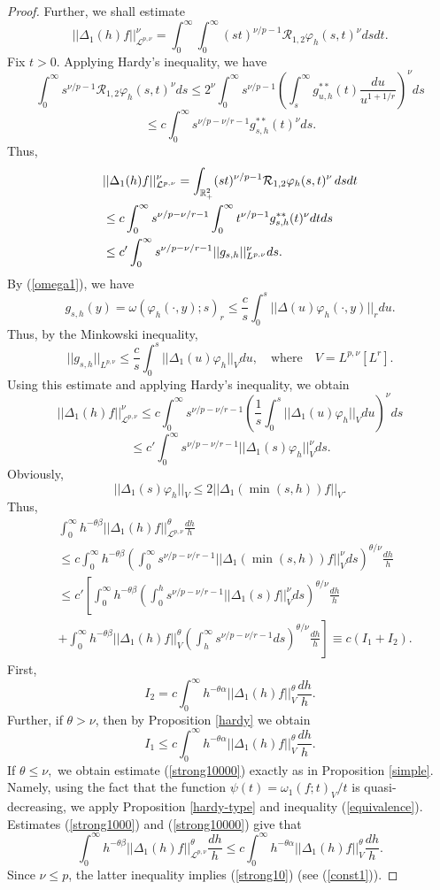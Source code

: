 \documentclass[12pt,twoside,reqno]{amsart}
\numberwithin{equation}{section}
\theoremstyle{definition}
\numberwithin{equation}{section}
\def\a{\alpha}
\def\b{\beta}
\def\o{\omega}
\def\t{\theta}
\def\f{\varphi}
\def\D{\Delta}
\begin{document}
\begin{proof}
Further, we shall estimate
$$
||\Delta_1 (h)f||_{\mathcal L^{p,\nu}}^\nu=\int_0^\infty\int_0^\infty(st)^{\nu/p-1}
\mathcal R_{1,2}\f_h(s,t)^\nu dsdt.
$$
Fix $t>0$. Applying Hardy's inequality, we have
$$
\int_0^\infty s^{\nu/p-1}
\mathcal R_{1,2}\f_h(s,t)^\nu ds\le 2^\nu \int_0^\infty s^{\nu/p-1} \left(\int_s^\infty g_{u,h}^{**}(t)\frac{du}{u^{1+1/r}}\right)^\nu ds
$$
$$
\le c\int_0^\infty s^{\nu/p-\nu/r-1}g_{s,h}^{**}(t)^\nu ds.
$$
Thus,
$$
\begin{aligned}
&||\Delta_1 (h)f||_{\mathcal L^{p,\nu}}^\nu=\int_{\Bbb R _+^2}
(st)^{\nu/p-1}\mathcal R_{1,2}\f_h(s,t)^\nu\,dsdt\\
&\le c\int_0^\infty s^{\nu/p-\nu/r-1}
\int_0^\infty t^{\nu/p-1}g_{s,h}^{**}(t)^\nu dtds\\
&\le  c'\int_0^\infty s^{\nu/p-\nu/r-1}||g_{s,h}||_{L^{p,\nu}}^\nu ds.
\end{aligned}
$$
By (\ref{omega1}), we have
$$
g_{s,h}(y)= \o(\f_h(\cdot,y);s)_r\le \frac{c}{s}\int_0^s ||\D(u)\f_h(\cdot,y)||_rdu.
$$
Thus, by the Minkowski inequality,
$$
||g_{s,h}||_{L^{p,\nu}}\le \frac{c}{s}\int_0^s ||\Delta_1(u)\f_h||_V du, \quad\mbox{where}\quad V=L^{p,\nu}[L^r].
$$
Using this estimate and applying Hardy's inequality, we obtain
$$
||\Delta_1 (h)f||_{\mathcal L^{p,\nu}}^\nu\le c \int_0^\infty s^{\nu/p-\nu/r-1}\left(\frac{1}{s}\int_0^s ||\Delta_1(u)\f_h||_V du\right)^\nu ds
$$
$$
\le c'\int_0^\infty s^{\nu/p-\nu/r-1}||\Delta_1(s)\f_h||_V^\nu ds.
$$
Obviously,
$$
||\D_1(s)\f_h||_V\le 2||\D_1(\min(s,h))f||_V.
$$
Thus,
$$
\begin{aligned}
&\int_0^\infty h^{-\t\b}||\Delta_1 (h)f||_{\mathcal L^{p,\nu}}^\t\frac{dh}{h}\\
&\le c \int_0^\infty h^{-\t\b}\left(\int_0^\infty s^{\nu/p-\nu/r-1}||\D_1(\min(s,h))f||_V^\nu ds\right)^{\t/\nu}\frac{dh}{h}\\
&\le c'\left[ \int_0^\infty h^{-\t\b}\left(\int_0^h s^{\nu/p-\nu/r-1}||\D_1(s)f||_V^\nu ds\right)^{\t/\nu}\frac{dh}{h}\right.\\
&+\left.\int_0^\infty h^{-\t\b}||\D_1(h)f||_V^\t\left(\int_h^\infty s^{\nu/p-\nu/r-1} ds\right)^{\t/\nu}\frac{dh}{h}\right]\equiv c(I_1+I_2).
\end{aligned}
$$
First,
\begin{equation}\label{strong1000}
I_2=c\int_0^\infty h^{-\t\a}||\D_1(h)f||_V^\t \frac{dh}{h}.
\end{equation}
Further, if  $\t>\nu$,  then by Proposition \ref{hardy}   we obtain
\begin{equation}\label{strong10000}
I_1\le c\int_0^\infty h^{-\t\a}||\D_1(h)f||_V^\t \frac{dh}{h}.
\end{equation}
If $\t\le\nu,$ we obtain estimate (\ref{strong10000}) exactly as in Proposition \ref{simple}. Namely, using the fact that the function
 $\psi(t)=\o_1(f;t)_V/t$
is quasi-decreasing, we apply
  Proposition  \ref{hardy-type} and inequality (\ref{equivalence}).
Estimates (\ref{strong1000}) and (\ref{strong10000}) give that
$$
\int_0^\infty h^{-\t\b}||\Delta_1 (h)f||_{\mathcal L^{p,\nu}}^\t\frac{dh}{h}\le c\int_0^\infty h^{-\t\a}||\D_1(h)f||_V^\t \frac{dh}{h}.
$$
Since $\nu\le p$,  the latter inequality implies
 (\ref{strong10}) (see (\ref{const1})).


\end{proof}
\end{document}
